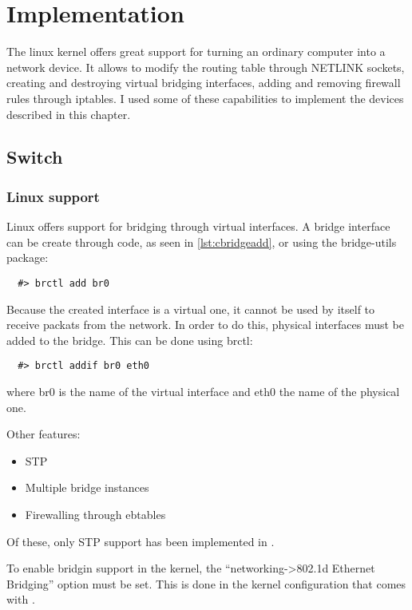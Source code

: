 \chapter{Implementation}
\label{chapter:impl}

The linux kernel offers great support for turning an ordinary computer into a network
device. It allows to modify the routing table through NETLINK sockets, creating
and destroying virtual bridging interfaces, adding and removing firewall rules through 
iptables. I used some of these capabilities to implement the devices described in this 
chapter.

\section{Switch}
\label{sec:switch-impl}

\subsection{Linux support}
\label{sub-sec:switch-lin}

Linux offers support for bridging through virtual interfaces. A bridge interface
can be create through code, as seen in \ref{lst:cbridgeadd}, or using the bridge-utils
package:
\lstset{language=zsh,caption=Adding a bridge interface,label=lst:sbridgeadd}
\begin{lstlisting}
  #> brctl add br0
\end{lstlisting}
Because the created interface is a virtual one, it cannot be used by itself to receive packats
from the network. In order to do this, physical interfaces must be added to the bridge. This 
can be done using brctl:
\lstset{language=zsh,caption=Adding a bridge interface,label=lst:sportadd}
\begin{lstlisting}
  #> brctl addif br0 eth0
\end{lstlisting}
where br0 is the name of the virtual interface and eth0 the name of the physical one.

Other features:
\begin{itemize}
  \item STP
  \item Multiple bridge instances
  \item Firewalling through ebtables
\end{itemize}
Of these, only STP support has been implemented in \textbf{\project}.

To enable bridgin support in the kernel, the ``networking->802.1d Ethernet Bridging'' option
must be set. This is done in the kernel configuration that comes with \textbf{\project}.

